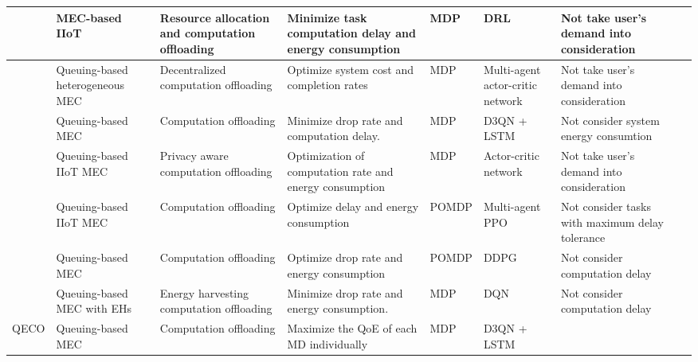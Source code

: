 \documentclass[10pt, journal,letterpaper]{IEEEtran}
\begin{document}
\begin{table}[htbp]
{{\begin{tabular}{ lp{2.2cm}p{3cm}p{3.4cm}p{0.7cm}p{2cm}p{3.2cm}l}
				\cite{gong2022edge} & MEC-based IIoT & Resource allocation and computation offloading & Minimize task computation delay and energy consumption & MDP & DRL & Not take user's demand into consideration\\\midrule
				\cite{gao2022large} & Queuing-based heterogeneous MEC & Decentralized computation offloading & Optimize system cost and completion rates & MDP & Multi-agent actor-critic network& Not take user's demand into consideration \\\midrule
				\cite{9253665} &  Queuing-based MEC &  Computation offloading & Minimize drop rate and computation delay. & MDP & D3QN + LSTM & Not consider system energy consumtion\\\midrule
				\cite{wu2024combining}  & Queuing-based IIoT MEC & Privacy aware computation offloading & Optimization of computation rate and energy consumption & MDP & Actor-critic network  & Not take user's demand into consideration \\\midrule
				\cite{wu2023multi} & Queuing-based IIoT MEC & Computation offloading & Optimize delay and energy consumption & POMDP & Multi-agent PPO&  Not consider tasks with maximum delay tolerance \\\midrule
				\cite{huang2021deadline} & Queuing-based MEC & Computation offloading & Optimize drop rate and energy consumption & POMDP & DDPG & Not consider computation delay \\ \midrule
				\cite{Bolourian-WCL24}  & Queuing-based MEC with EHs& Energy harvesting  computation offloading & Minimize drop rate and energy consumption. & MDP  & DQN & Not consider computation delay  \\\midrule
				QECO &  Queuing-based MEC &  Computation offloading & Maximize the QoE of each MD individually &MDP & D3QN + LSTM & \\
				\toprule
		\end{tabular}}
		\label{table1}}
\end{table}
\end{document}
